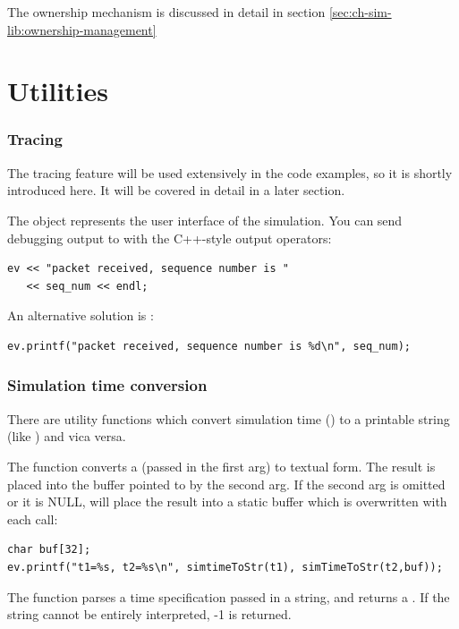 The ownership mechanism is discussed in detail in section
\ref{sec:ch-sim-lib:ownership-management}


\section{Utilities}

\subsubsection{Tracing}


The tracing feature will be used extensively in the code examples,
so it is shortly introduced here. It will be covered in detail
in a later section.

The  object represents the user interface of the
simulation.  You can send debugging output to  with the C++-style
output operators:

\begin{verbatim}
ev << "packet received, sequence number is "
   << seq_num << endl;
\end{verbatim}

An alternative solution is :

\begin{verbatim}
ev.printf("packet received, sequence number is %d\n", seq_num);
\end{verbatim}

\subsubsection{Simulation time conversion}


There are utility functions which convert simulation
time () to a printable string
(like ) and vica versa.


The  function converts a 
(passed in the first arg) to textual form. The result is placed into
the buffer pointed to by the second arg. If the second arg is omitted
or it is NULL,  will place the result into a
static buffer which is overwritten with each call:

\begin{verbatim}
char buf[32];
ev.printf("t1=%s, t2=%s\n", simtimeToStr(t1), simTimeToStr(t2,buf));
\end{verbatim}


The  function parses a time specification passed
in a string, and returns a . If the string cannot
be entirely interpreted, -1 is returned.

